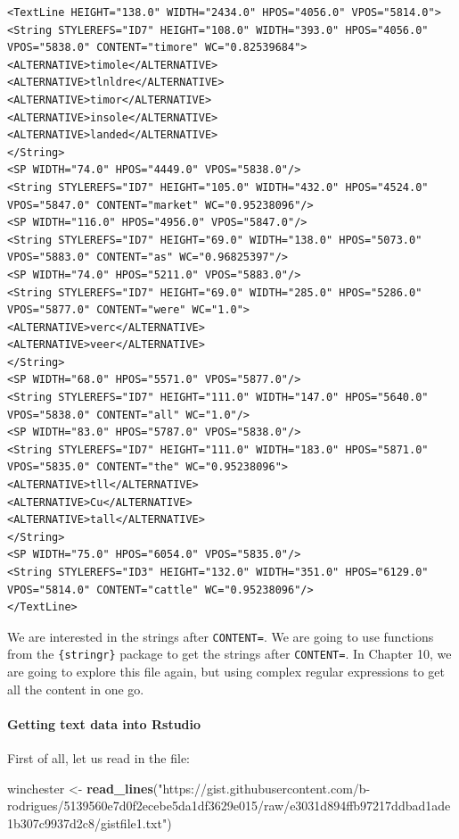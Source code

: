 \documentclass[]{gitbook}
\newenvironment{Shaded}{\begin{snugshade}}{\end{snugshade}}
\newcommand{\KeywordTok}[1]{\textcolor[rgb]{0.13,0.29,0.53}{\textbf{#1}}}
\newcommand{\NormalTok}[1]{#1}
\newcommand{\StringTok}[1]{\textcolor[rgb]{0.31,0.60,0.02}{#1}}
\let\oldparagraph\paragraph
\renewcommand{\paragraph}[1]{\oldparagraph{#1}\mbox{}}
\begin{document}
\begin{verbatim}
<TextLine HEIGHT="138.0" WIDTH="2434.0" HPOS="4056.0" VPOS="5814.0">
<String STYLEREFS="ID7" HEIGHT="108.0" WIDTH="393.0" HPOS="4056.0" VPOS="5838.0" CONTENT="timore" WC="0.82539684">
<ALTERNATIVE>timole</ALTERNATIVE>
<ALTERNATIVE>tlnldre</ALTERNATIVE>
<ALTERNATIVE>timor</ALTERNATIVE>
<ALTERNATIVE>insole</ALTERNATIVE>
<ALTERNATIVE>landed</ALTERNATIVE>
</String>
<SP WIDTH="74.0" HPOS="4449.0" VPOS="5838.0"/>
<String STYLEREFS="ID7" HEIGHT="105.0" WIDTH="432.0" HPOS="4524.0" VPOS="5847.0" CONTENT="market" WC="0.95238096"/>
<SP WIDTH="116.0" HPOS="4956.0" VPOS="5847.0"/>
<String STYLEREFS="ID7" HEIGHT="69.0" WIDTH="138.0" HPOS="5073.0" VPOS="5883.0" CONTENT="as" WC="0.96825397"/>
<SP WIDTH="74.0" HPOS="5211.0" VPOS="5883.0"/>
<String STYLEREFS="ID7" HEIGHT="69.0" WIDTH="285.0" HPOS="5286.0" VPOS="5877.0" CONTENT="were" WC="1.0">
<ALTERNATIVE>verc</ALTERNATIVE>
<ALTERNATIVE>veer</ALTERNATIVE>
</String>
<SP WIDTH="68.0" HPOS="5571.0" VPOS="5877.0"/>
<String STYLEREFS="ID7" HEIGHT="111.0" WIDTH="147.0" HPOS="5640.0" VPOS="5838.0" CONTENT="all" WC="1.0"/>
<SP WIDTH="83.0" HPOS="5787.0" VPOS="5838.0"/>
<String STYLEREFS="ID7" HEIGHT="111.0" WIDTH="183.0" HPOS="5871.0" VPOS="5835.0" CONTENT="the" WC="0.95238096">
<ALTERNATIVE>tll</ALTERNATIVE>
<ALTERNATIVE>Cu</ALTERNATIVE>
<ALTERNATIVE>tall</ALTERNATIVE>
</String>
<SP WIDTH="75.0" HPOS="6054.0" VPOS="5835.0"/>
<String STYLEREFS="ID3" HEIGHT="132.0" WIDTH="351.0" HPOS="6129.0" VPOS="5814.0" CONTENT="cattle" WC="0.95238096"/>
</TextLine>
\end{verbatim}

We are interested in the strings after \texttt{CONTENT=}. We are going to use functions from the \texttt{\{stringr\}}
package to get the strings after \texttt{CONTENT=}. In Chapter 10, we are going to explore this file
again, but using complex regular expressions to get all the content in one go.

\hypertarget{getting-text-data-into-rstudio}{%
\paragraph{Getting text data into Rstudio}\label{getting-text-data-into-rstudio}}

First of all, let us read in the file:

\begin{Shaded}
\begin{Highlighting}[]
\NormalTok{winchester <-}\StringTok{ }\KeywordTok{read_lines}\NormalTok{(}\StringTok{"https://gist.githubusercontent.com/b-rodrigues/5139560e7d0f2ecebe5da1df3629e015/raw/e3031d894ffb97217ddbad1ade1b307c9937d2c8/gistfile1.txt"}\NormalTok{)}
\end{Highlighting}
\end{Shaded}
\end{document}
